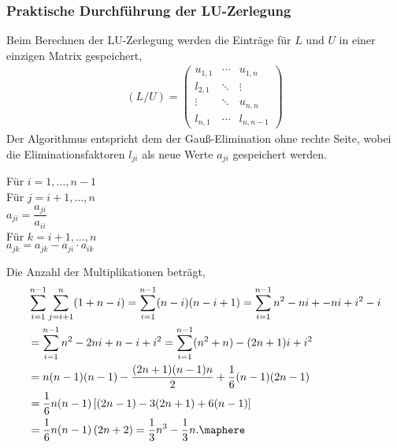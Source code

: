 \subsubsection{Praktische Durchführung der LU-Zerlegung}
Beim Berechnen der LU-Zerlegung werden die Einträge für $L$ und $U$ in einer
einzigen Matrix gespeichert,
\begin{align*}
(L/U) =
\begin{pmatrix}
u_{1,1} & \cdots & u_{1,n}\\
l_{2,1} & \ddots &\vdots \\
\vdots & \ddots & u_{n,n}\\
l_{n,1} & \cdots & l_{n,n-1}
\end{pmatrix}
\end{align*}
Der Algorithmus entspricht dem der Gauß-Elimination ohne rechte Seite, wobei
die Eliminationsfaktoren $l_{ji}$ als neue Werte $a_{ji}$ gespeichert werden.
\begin{tabbing}
\hspace{20pt}	Für $i=1,\ldots,n-1$\\
\hspace{40pt}		Für $j=i+1,\ldots,n$\\
\hspace{60pt}			$a_{ji} = \dfrac{a_{ji}}{a_{ii}}$\\
\hspace{60pt}			Für $k=i+1,\ldots,n$\\
\hspace{80pt}				$a_{jk} = a_{jk}-a_{ji}\cdot a_{ik}$\\
\end{tabbing}
\begin{bemn}[Rechenaufwand.]
Die Anzahl der Multiplikationen beträgt,
\begin{align*}
&\sum\limits_{i=1}^{n-1}\sum\limits_{j=i+1}^n (1+n-i)
= \sum\limits_{i=1}^{n-1} (n-i)(n-i+1)
= \sum\limits_{i=1}^{n-1} n^2 - ni +  - ni + i^2 -i\\
&= \sum\limits_{i=1}^{n-1} n^2 - 2ni + n - i + i^2= \sum\limits_{i=1}^{n-1}
(n^2+n) - (2n+1)i + i^2\\
&= n(n-1)(n-1) - \frac{(2n+1)(n-1)n}{2} + \frac{1}{6}(n-1)(2n-1)\\
&=\frac{1}{6}n(n-1)\left[(2n-1) - 3(2n+1) + 6(n-1) \right]\\
&= \frac{1}{6}n(n-1)\left(2n+2\right) = \frac{1}{3}n^3 - \frac{1}{3}n.\maphere
\end{align*}
\end{bemn}

